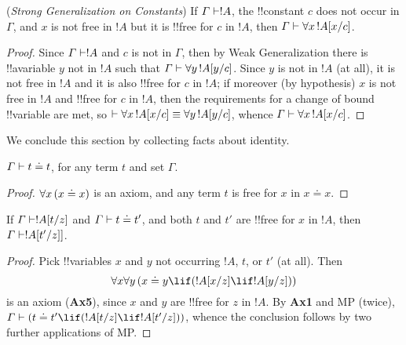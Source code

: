 \documentclass[../../include/open-logic-section]{subfiles}
\begin{document}
\begin{thm}
  (\emph{Strong Generalization on Constants}) If $\Gamma \Proves
  !A$, the !!{constant} $c$ does not occur in $\Gamma$, and $x$ is
  not free in $!A$ but it is !!{free for} $c$ in $!A$, then
  $\Gamma \Proves \lforall[x][\Subst{!A}{x}{c}]$.
\end{thm}

\begin{proof}
  Since $\Gamma \Proves !A$ and $c$ is not in $\Gamma$, then by
  Weak Generalization there is !!a{variable} $y$ not in $!A$ such
  that $\Gamma \Proves \lforall[y][\Subst{!A}{y}{c}]$. Since $y$ is not
  in $!A$ (at all), it is not free in $!A$ and it is also
  !!{free for} $c$ in $!A$; if moreover (by hypothesis) $x$ is not
  free in $!A$ and !!{free for} $c$ in $!A$, then the
  requirements for a change of bound !!{variable} are met, so $\Proves
  \lforall[x][\Subst{!A}{x}{c}] \equiv \lforall[y][\Subst{!A}{y}{c}]$,
  whence $\Gamma \Proves \lforall[x][\Subst{!A}{x}{c}]$.
\end{proof}

We conclude this section by collecting facts about identity.

\begin{prop}
 $\Gamma \Proves t \doteq t$, for any term $t$ and set
  $\Gamma$.
\end{prop}

\begin{proof}
  $\lforall[x][(x \doteq x)]$ is an axiom, and any term $t$ is free for
  $x$ in $x \doteq x$. 
\end{proof}

\begin{prop}
  If $\Gamma \Proves \Subst{!A}{t}{z}$ and $\Gamma \Proves t \doteq
  t'$, and both $t$ and $t'$ are !!{free for} $x$ in $!A$, then
  $\Gamma \Proves \Subst{!A}{t'}{z}]$.  
\end{prop}

\begin{proof}
  Pick !!{variable}s $x$ and $y$ not occurring $!A$, $t$, or $t'$ (at
  all). Then 
  \[
  \lforall[x]\lforall[y][(x \doteq y \lif (\Subst{!A}{x}{z}] \lif
  \Subst{!A}{y}{z})) 
  \]
  is an axiom (\textbf{Ax5}), since $x$ and $y$ are !!{free for} $z$ in
  $!A$. By \textbf{Ax1} and MP (twice), $\Gamma \Proves (t \doteq t'
  \lif (\Subst{!A}{t}{z} \lif \Subst{!A}{t'}{z}))$, whence the
  conclusion follows by two further applications of MP. 
\end{proof}
\end{document}
